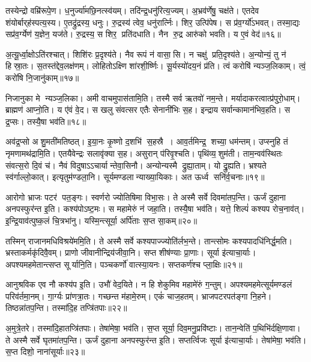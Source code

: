 तस्येन्द्रो वम्रि॑रूपे॒ण। ध॒नुर्ज्या॑मछि॒नत्स्व॑यम्। 
तदि॑न्द्र॒धनु॑\-रित्य॒ज्यम्। अ॒भ्रव॑र्णेषु॒ चक्ष॑ते। 
एतदेव शंयोर्बार्‌ह॑स्पत्य॒स्य। ए॒तद्रु॑द्रस्य॒ धनुः। 
रु॒द्रस्य॑ त्वेव॒ धनु॑रार्त्निः। शिर॒ उत्पि॑पेष। 
स प्र॑व॒र्ग्यो॑ऽभवत्‌। तस्मा॒द्यः सप्र॑व॒र्ग्येण॑ य॒ज्ञेन॒ यज॑ते। 
रु॒द्रस्य॒ स शिर॒ प्रति॑दधाति। नैन रु॒द्र आरु॑को भवति। य ए॒वं वेद॑॥१६॥\anuvakamend


अ॒त्यू॒र्ध्वा॒क्षोऽति॑रश्चात्‌। शिशि॑रः प्र॒दृश्य॑ते। 
नैव रूपं न॑ वासा॒सि। न चक्षु॑ प्रति॒दृश्य॑ते। 
अ॒न्योन्यं॒ तु न॑ हिस्रा॒तः। स॒तस्त॑द्देव॒लक्ष॑णम्‌। 
लोहितोऽक्ष्णि शा॑रशी॒र्ष्णिः। सू॒र्यस्यो॑दय॒नं प्र॑ति। 
त्वं करोषि॑ न्यञ्ज॒लिकाम्‌। त्वं॒ करो॑षि नि॒जानु॑काम्‌॥१७॥

निजानुका मे न्यञ्ज॒लिका। अमी वाचमुपास॑तामि॒ति। 
तस्मै सर्व ऋतवो॑ नम॒न्ते। मर्यादाकरत्वात्प्र॑\-पुरो॒धाम्। 
ब्राह्मण॑ आप्नो॒ति। य ए॑वं वे॒द। स खलु संवत्सर एतैः सेनानी॑भिः स॒ह। 
इन्द्राय सर्वान्कामान॑भिव॒हति। स द्र॒प्सः। तस्यै॒षा भव॑ति॥१८॥

अव॑द्र॒प्सो अशु॒मती॑मतिष्ठत्‌। इ॒या॒नः कृ॒ष्णो द॒शभि॑ स॒हस्रै। 
आव॒र्तमिन्द्र॒ शच्या॒ धम॑न्तम्‌। उप्स्नुहि तं नृमणामथ॑द्रामि॒ति। 
एतयैवेन्द्रः सलावृ॑क्या स॒ह। असुरान्‌ प॑रिवृ॒श्चति। 
पृथि॑व्य॒शुम॑ती। ताम॒न्वव॑स्थितः संवत्स॒रो दि॒वं च॑। 
नैवं विदुषाऽऽचार्यान्तेवा॒सिनौ। अन्योन्यस्मै द्रुह्या॒ताम्। यो द्रु॒ह्यति। 
भ्रश्यते स्व॑र्गाल्लो॒कात्‌। इत्यृतुम॑ण्डला॒नि। 
सूर्यमण्डलान्या\-ख्या॒यिकाः। अत ऊर्ध्व सनि॑र्व॒चनाः॥१९॥\anuvakamend


आरोगो भ्राजः पटर॑ पत॒ङ्गः। स्वर्णरो ज्योतिषिमा\sn{} विभा॒सः। 
ते अस्मै सर्वे दिवमा॑तप॒न्ति। ऊर्जं दुहाना अनपस्फुर॑न्त इ॒ति। 
कश्य॑पोऽष्ट॒मः। स महामेरुं न॑ जहा॒ति। 
तस्यै॒षा भव॑ति। यत्ते॒ शिल्पं॑ कश्यप रोच॒नाव॑त्‌। 
इ॒न्द्रि॒याव॑त्पुष्क॒लं चि॒त्रभा॑नु। यस्मि॒न्त्सूर्या॒ अर्पि॑ताः स॒प्त सा॒कम्‌॥२०॥

तस्मिन्‌ राजानमधिविश्रये॑ममि॒ति। ते अस्मै सर्वे कश्यपाज्ज्यो\-ति॑र्लभ॒न्ते। 
तान्त्सोमः कश्यपादधि॑निर्द्ध॒मति। भ्रस्ताकर्मकृ॑दिवै॒वम्‌। 
प्राणो जीवानीन्द्रिय॑जीवा॒नि। सप्त शी\ur{}ष॑ण्याः प्रा॒णाः। 
सूर्या इ॑त्याचा॒र्याः। अपश्यमहमेतान्त्सप्त सूर्यानि॒ति। 
पञ्चकर्णो॑ वात्स्या॒यनः। सप्तकर्ण॑श्च प्ला॒क्षिः॥२१॥

आनुश्रविक एव नौ कश्य॑प इ॒ति। उभौ॑ वेद॒यिते। 
न हि शेकुमिव महामे॑रुं ग॒न्तुम्। अपश्यमहमेत्सूर्यमण्डलं परिव॑र्तमा॒नम्। 
गा॒र्ग्यः प्रा॑णत्रा॒तः। गच्छन्त म॑हामे॒रुम्। एकं॑ चाज॒हतम्। 
भ्राजपटरपत॑ङ्गा नि॒हने। तिष्ठन्ना॑तप॒न्ति। तस्मा॑दि॒ह तप्त्रि॑तपाः॥२२॥

अ॒मुत्रे॒तरे। तस्मा॑दि॒हातप्त्रि॑तपाः। तेषा॑मेषा॒ भव॑ति। 
स॒प्त सूर्या॒ दिव॒मनु॒प्रवि॑ष्टाः। तान॒न्वेति॑ प॒थिभि॑र्दक्षि॒णावा\sn{}। 
ते अस्मै सर्वे घृतमा॑तप॒न्ति। ऊर्जं दुहाना अनपस्फुर॑न्त इ॒ति। 
सप्तर्त्विजः सूर्या इ॑त्याचा॒र्याः। तेषा॑मेषा॒ भव॑ति। स॒प्त दिशो॒ नाना॑सूर्याः॥२३॥

